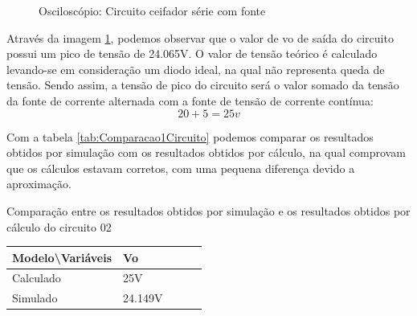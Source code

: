 \begin{figure}[H]
    \centering
    \caption{Osciloscópio: Circuito ceifador série com fonte}
    \vspace{-0.3cm}
    \label{fig:OsciloscopioCircuito01}
\end{figure}

Através da imagem \ref{fig:OsciloscopioCircuito01}, podemos observar que o valor de vo de saída do circuito possui um pico de tensão de 24.065V. O valor de tensão teórico é calculado levando-se em consideração um diodo ideal, na qual não representa queda de tensão. Sendo assim, a tensão de pico do circuito será o valor somado da tensão da fonte de corrente alternada com a fonte de tensão de corrente contínua: \[20 + 5 = 25v\]

Com a tabela \ref{tab:Comparacao1Circuito} podemos comparar os resultados obtidos por simulação com os resultados obtidos por cálculo, na qual comprovam que os cálculos estavam corretos, com uma pequena diferença devido a aproximação.

\begin{quadro}[H]
    \centering
    \caption{Comparação entre os resultados obtidos por simulação e os resultados obtidos por cálculo do circuito 02}
    \begin{tabular}{|C{0.34\textwidth}|C{0.19\textwidth}|C{0.19\textwidth}|C{0.19\textwidth}|C{0.19\textwidth}|}
        \hline
        \textbf{Modelo\textbackslash{}Variáveis} & \textbf{Vo} \\
        \hline
        Calculado & 25V \\
        \hline
        Simulado & 24.149V \\
        \hline
    \end{tabular}
    \vspace{-0.6cm}
    \label{tab:Comparacao1Circuito}
\end{quadro}

